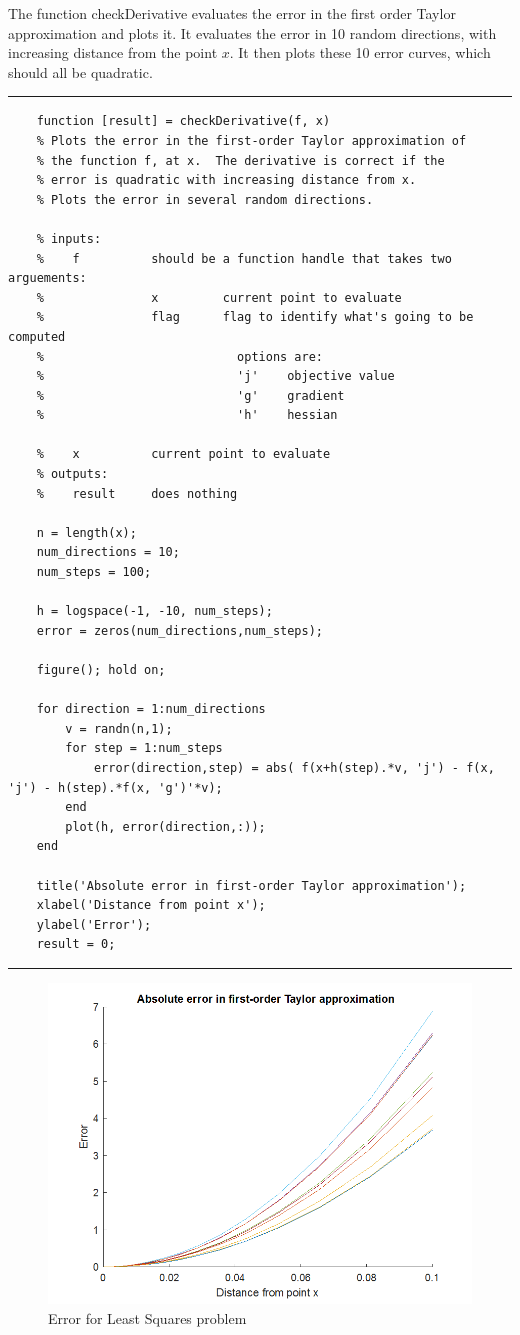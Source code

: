 \documentclass{article}
\begin{document}
	The function checkDerivative evaluates the error in the first order Taylor approximation and plots it.  It evaluates the error in 10 random directions, with increasing distance from the point $x$.  It then plots these 10 error curves, which should all be quadratic.  
	
	\noindent\rule{\textwidth}{1pt}
	\begin{verbatim}
	function [result] = checkDerivative(f, x)
	% Plots the error in the first-order Taylor approximation of 
	% the function f, at x.  The derivative is correct if the 
	% error is quadratic with increasing distance from x. 
	% Plots the error in several random directions.
	
	% inputs:
	%    f          should be a function handle that takes two arguements:
	%               x         current point to evaluate
	%               flag      flag to identify what's going to be computed
	%                           options are:
	%                           'j'    objective value
	%                           'g'    gradient
	%                           'h'    hessian
	
	%    x          current point to evaluate
	% outputs:
	%    result     does nothing
	
	n = length(x);
	num_directions = 10;
	num_steps = 100;
	
	h = logspace(-1, -10, num_steps);
	error = zeros(num_directions,num_steps);
	
	figure(); hold on;
	
	for direction = 1:num_directions
	    v = randn(n,1);
    	for step = 1:num_steps
	        error(direction,step) = abs( f(x+h(step).*v, 'j') - f(x, 'j') - h(step).*f(x, 'g')'*v); 
	    end
	    plot(h, error(direction,:));
	end
	
	title('Absolute error in first-order Taylor approximation');
	xlabel('Distance from point x');
	ylabel('Error');
	result = 0;
	\end{verbatim}
	\noindent\rule{\textwidth}{1pt}
	
	
	\begin{figure}[h]
		\centering
		\includegraphics[width=0.7\linewidth]{comp_image/q04}
		\caption[Error for Least Squares problem]{Error for Least Squares problem}
		\label{fig:q04}
	\end{figure}
	
\end{document}
